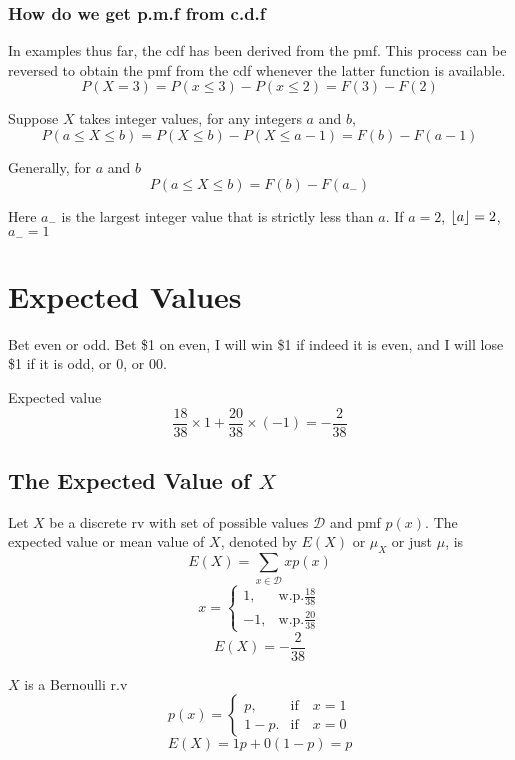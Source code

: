 \subsubsection{How do we get p.m.f from c.d.f}
In examples thus far, the cdf has been derived from the pmf. This process can be reversed to obtain the pmf from the cdf whenever the latter function is available.
\[P(X=3)=P(x\leq 3)-P(x \leq 2)=F(3)-F(2)\]

Suppose $X$ takes integer values, for any integers $a$ and $b$,
\[P(a\leq X \leq b)=P( X \leq b)-P(X \leq a-1)=F(b)-F(a-1)\]

Generally, for $a$ and $b$
\[P(a\leq X \leq b)=F(b)-F(a_-)\]

Here $a_-$ is the largest integer value that is strictly less than $a$. If $a=2$, $\floor*{a}=2$, $a_-=1$  

\section{Expected Values}
\begin{exmp} 
Bet even or odd. Bet \$1 on even, I will win \$1 if indeed it is even, and I will lose \$1 if it is odd, or 0, or 00.

Expected value
\[	\frac{18}{38}\times1+\frac{20}{38}\times(-1)=-\frac{2}{38}	\]

\end{exmp}

\subsection{The Expected Value of $X$}
\begin{defn}
Let $X$ be a discrete rv with set of possible values $\mathcal{D}$ and pmf $p(x)$. The expected value or mean value of $X$, denoted by $E(X)$ or $\mu_X$ or just $\mu$, is
\[E(X)=\sum_{x\in \mathcal{D}} x p(x)\]
\[x=\begin{cases}
1,&\text{w.p.}\frac{18}{38} \\
-1,&\text{w.p.}\frac{20}{38}
\end{cases}\]
\[ E(X)=-\frac{2}{38}\]
\end{defn}

\begin{exmp}
$X$ is a Bernoulli r.v
\[p(x)=\begin{cases}
p, & \text{if} \quad x=1\\
1-p. & \text{if} \quad x=0
\end{cases}\]
\[E(X)=1 p+0 (1-p)=p\]
\end{exmp}

